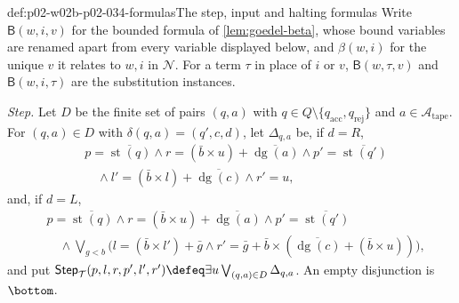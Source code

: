 \begin{hbdefinition}{def:p02-w02b-p02-034-formulas}{The step, input and halting formulas}
Write \(\mathsf B(w,i,v)\) for the bounded formula of \cref{lem:goedel-beta},
whose bound variables are renamed apart from every variable displayed below,
and \(\beta(w,i)\) for the unique \(v\) it relates to \(w,i\) in
\(\mathcal N\).  For a term \(\tau\) in place of \(i\) or \(v\),
\(\mathsf B(w,\tau,v)\) and \(\mathsf B(w,i,\tau)\) are the substitution
instances.

\emph{Step.}  Let \(D\) be the finite set of pairs \((q,a)\) with
\(q\in Q\setminus\{q_{\mathrm{acc}},q_{\mathrm{rej}}\}\) and
\(a\in\mathcal A_{\mathrm{tape}}\).  For \((q,a)\in D\) with
\(\delta(q,a)=(q',c,d)\), let \(\Delta_{q,a}\) be, if \(d=R\),
\[
\begin{aligned}
 &p=\overline{\operatorname{st}(q)}\land r=(\bar b\times u)+\overline{\operatorname{dg}(a)}
   \land p'=\overline{\operatorname{st}(q')}\\
 &\quad\land l'=(\bar b\times l)+\overline{\operatorname{dg}(c)}
   \land r'=u,
\end{aligned}
\]
and, if \(d=L\),
\[
\begin{aligned}
 &p=\overline{\operatorname{st}(q)}\land r=(\bar b\times u)+\overline{\operatorname{dg}(a)}
   \land p'=\overline{\operatorname{st}(q')}\\
 &\quad\land\bigvee_{g<b}\bigl(l=(\bar b\times l')+\bar g\land
   r'=\bar g+\bar b\times(\overline{\operatorname{dg}(c)}+(\bar b\times u))\bigr),
\end{aligned}
\]
and put
\(\mathsf{Step}_{\mathcal T}(p,l,r,p',l',r')\defeq\exists u\bigvee_{(q,a)\in D}\Delta_{q,a}\).
An empty disjunction is \(\bottom\).


\end{hbdefinition}
